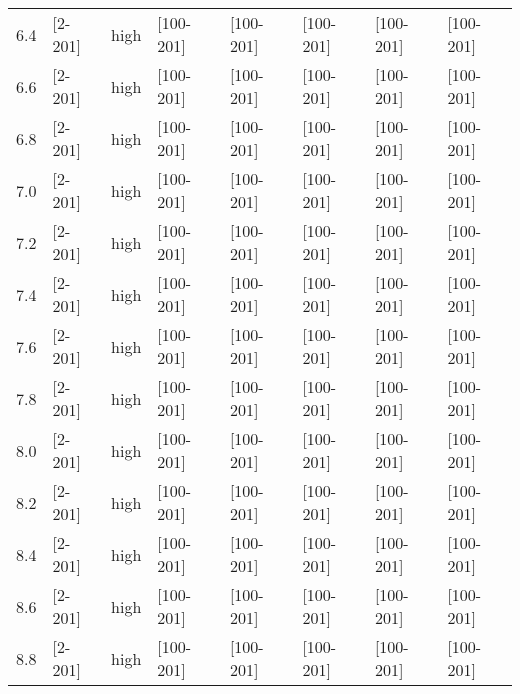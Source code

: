 \documentclass{article}
\begin{document}
\begin{tabular}{ l | l | l | l | l }
      6.4 & [2-201] & high & [100-201] & [100-201] & [100-201] & [100-201] & [100-201] &\\
      6.6 & [2-201] & high & [100-201] & [100-201] & [100-201] & [100-201] & [100-201] &\\
      6.8 & [2-201] & high & [100-201] & [100-201] & [100-201] & [100-201] & [100-201] &\\
      7.0 & [2-201] & high & [100-201] & [100-201] & [100-201] & [100-201] & [100-201] &\\
      7.2 & [2-201] & high & [100-201] & [100-201] & [100-201] & [100-201] & [100-201] &\\
      7.4 & [2-201] & high & [100-201] & [100-201] & [100-201] & [100-201] & [100-201] &\\
      7.6 & [2-201] & high & [100-201] & [100-201] & [100-201] & [100-201] & [100-201] &\\
      7.8 & [2-201] & high & [100-201] & [100-201] & [100-201] & [100-201] & [100-201] &\\
      8.0 & [2-201] & high & [100-201] & [100-201] & [100-201] & [100-201] & [100-201] &\\
      8.2 & [2-201] & high & [100-201] & [100-201] & [100-201] & [100-201] & [100-201] &\\
      8.4 & [2-201] & high & [100-201] & [100-201] & [100-201] & [100-201] & [100-201] &\\
      8.6 & [2-201] & high & [100-201] & [100-201] & [100-201] & [100-201] & [100-201] &\\
      8.8 & [2-201] & high & [100-201] & [100-201] & [100-201] & [100-201] & [100-201] &\\
      \hline
    \end{tabular}
\end{document}
